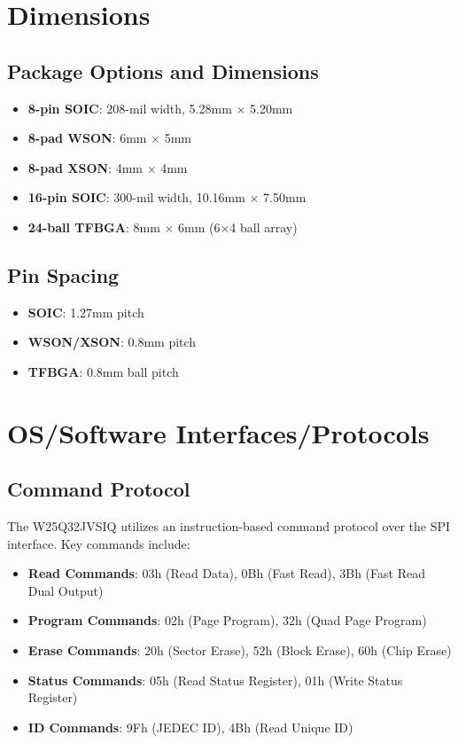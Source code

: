 \section{Dimensions}

\subsection{Package Options and Dimensions}
\begin{itemize}
	\item \textbf{8-pin SOIC}: 208-mil width, 5.28mm × 5.20mm
	\item \textbf{8-pad WSON}: 6mm × 5mm
	\item \textbf{8-pad XSON}: 4mm × 4mm
	\item \textbf{16-pin SOIC}: 300-mil width, 10.16mm × 7.50mm
	\item \textbf{24-ball TFBGA}: 8mm × 6mm (6×4 ball array) \cite{Winbond:2024}
\end{itemize}

\subsection{Pin Spacing}
\begin{itemize}
	\item \textbf{SOIC}: 1.27mm pitch
	\item \textbf{WSON/XSON}: 0.8mm pitch
	\item \textbf{TFBGA}: 0.8mm ball pitch \cite{Winbond:2016}
\end{itemize}

\section{OS/Software Interfaces/Protocols}

\subsection{Command Protocol}
The W25Q32JVSIQ utilizes an instruction-based command protocol over the SPI interface. Key commands include:
\begin{itemize}
	\item \textbf{Read Commands}: 03h (Read Data), 0Bh (Fast Read), 3Bh (Fast Read Dual Output)
	\item \textbf{Program Commands}: 02h (Page Program), 32h (Quad Page Program)
	\item \textbf{Erase Commands}: 20h (Sector Erase), 52h (Block Erase), 60h (Chip Erase)
	\item \textbf{Status Commands}: 05h (Read Status Register), 01h (Write Status Register)
	\item \textbf{ID Commands}: 9Fh (JEDEC ID), 4Bh (Read Unique ID) \cite{Winbond:2016}
\end{itemize}

